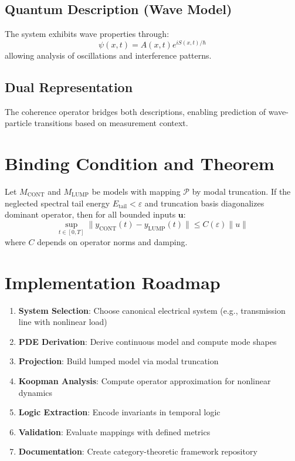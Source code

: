 \documentclass[11pt,a4paper]{article}
\begin{document}
\subsection{Quantum Description (Wave Model)}
The system exhibits wave properties through:
\begin{equation}
\psi(x,t) = A(x,t)e^{iS(x,t)/\hbar}
\end{equation}
allowing analysis of oscillations and interference patterns.

\subsection{Dual Representation}
The coherence operator bridges both descriptions, enabling prediction of wave-particle transitions based on measurement context.

\section{Binding Condition and Theorem}
\label{sec:theorem}

\begin{theorem}
Let $M_{\text{CONT}}$ and $M_{\text{LUMP}}$ be models with mapping $\mathcal{P}$ by modal truncation. If the neglected spectral tail energy $E_{\text{tail}} < \varepsilon$ and truncation basis diagonalizes dominant operator, then for all bounded inputs $\mathbf{u}$:
\begin{equation}
\sup_{t \in [0,T]} \| y_{\text{CONT}}(t) - y_{\text{LUMP}}(t) \| \leq C(\varepsilon) \|u\|
\end{equation}
where $C$ depends on operator norms and damping.
\end{theorem}

\section{Implementation Roadmap}
\label{sec:implementation}

\begin{enumerate}
    \item \textbf{System Selection}: Choose canonical electrical system (e.g., transmission line with nonlinear load)
    \item \textbf{PDE Derivation}: Derive continuous model and compute mode shapes
    \item \textbf{Projection}: Build lumped model via modal truncation
    \item \textbf{Koopman Analysis}: Compute operator approximation for nonlinear dynamics
    \item \textbf{Logic Extraction}: Encode invariants in temporal logic
    \item \textbf{Validation}: Evaluate mappings with defined metrics
    \item \textbf{Documentation}: Create category-theoretic framework repository
\end{enumerate}
\end{document}
